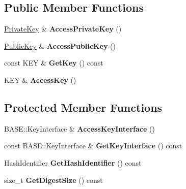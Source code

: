 \subsection*{Public Member Functions}
\begin{DoxyCompactItemize}
\item 
\hypertarget{class_d_l___object_impl_base_acf6b42d2625531e2a687315ed8a6ce3f}{
\hyperlink{class_private_key}{PrivateKey} \& {\bfseries AccessPrivateKey} ()}
\label{class_d_l___object_impl_base_acf6b42d2625531e2a687315ed8a6ce3f}

\item 
\hypertarget{class_d_l___object_impl_base_a0752de1b25d033c60f10dec6a73a087c}{
\hyperlink{class_public_key}{PublicKey} \& {\bfseries AccessPublicKey} ()}
\label{class_d_l___object_impl_base_a0752de1b25d033c60f10dec6a73a087c}

\item 
\hypertarget{class_d_l___object_impl_base_a7c5dfaa1d89456b201a0f0431ad42e7c}{
const KEY \& {\bfseries GetKey} () const }
\label{class_d_l___object_impl_base_a7c5dfaa1d89456b201a0f0431ad42e7c}

\item 
\hypertarget{class_d_l___object_impl_base_add3080d45df60168f02e2a0a894f1bea}{
KEY \& {\bfseries AccessKey} ()}
\label{class_d_l___object_impl_base_add3080d45df60168f02e2a0a894f1bea}

\end{DoxyCompactItemize}
\subsection*{Protected Member Functions}
\begin{DoxyCompactItemize}
\item 
\hypertarget{class_d_l___object_impl_base_af4e61281fd0ea2b6097915d330566c00}{
BASE::KeyInterface \& {\bfseries AccessKeyInterface} ()}
\label{class_d_l___object_impl_base_af4e61281fd0ea2b6097915d330566c00}

\item 
\hypertarget{class_d_l___object_impl_base_a0d7af27b16078118b401f04adada8977}{
const BASE::KeyInterface \& {\bfseries GetKeyInterface} () const }
\label{class_d_l___object_impl_base_a0d7af27b16078118b401f04adada8977}

\item 
\hypertarget{class_d_l___object_impl_base_a9467b962b5be20e0e358aad0ade7cc18}{
HashIdentifier {\bfseries GetHashIdentifier} () const }
\label{class_d_l___object_impl_base_a9467b962b5be20e0e358aad0ade7cc18}

\item 
\hypertarget{class_d_l___object_impl_base_a7d0d6de472834351e262bcc1887b214f}{
size\_\-t {\bfseries GetDigestSize} () const }
\label{class_d_l___object_impl_base_a7d0d6de472834351e262bcc1887b214f}

\end{DoxyCompactItemize}


